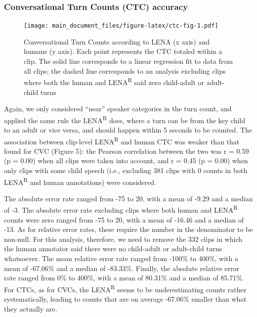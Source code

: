 \documentclass[english,table,man,floatsintext]{apa6}
\begin{document}
\hypertarget{conversational-turn-counts-ctc-accuracy}{%
\subsubsection{Conversational Turn Counts (CTC) accuracy}\label{conversational-turn-counts-ctc-accuracy}}

\begin{figure}
\centering
\texttt{[image: main\_document\_files/figure-latex/ctc-fig-1.pdf]}
\caption{\label{fig:ctc-fig}Conversational Turn Counts according to LENA (x axis) and humans (y axis). Each point represents the CTC totaled within a clip. The solid line corresponds to a linear regression fit to data from all clips; the dashed line corresponds to an analysis excluding clips where both the human and LENA\textsuperscript{R} said zero child-adult or adult-child turns}
\end{figure}

Again, we only considered \enquote{near} speaker categories in the turn count, and applied the same rule the LENA\textsuperscript{R} does, where a turn can be from the key child to an adult or vice versa, and should happen within 5 seconds to be counted. The association between clip-level LENA\textsuperscript{R} and human CTC was weaker than that found for CVC (Figure 5): the Pearson correlation between the two was r = 0.59 (p = 0.00) when all clips were taken into account, and r = 0.45 (p = 0.00) when only clips with some child speech (i.e., excluding 381 clips with 0 counts in both LENA\textsuperscript{R} and human annotations) were considered.

The absolute error rate ranged from -75 to 20, with a mean of -9.29 and a median of -3. The absolute error rate excluding clips where both human and LENA\textsuperscript{R} counts were zero ranged from -75 to 20, with a mean of -16.46 and a median of -13. As for relative error rates, these require the number in the denominator to be non-null. For this analysis, therefore, we need to remove the 332 clips in which the human annotator said there were no child-adult or adult-child turns whatsoever. The mean relative error rate ranged from -100\% to 400\%, with a mean of -67.06\% and a median of -83.33\%. Finally, the absolute relative error rate ranged from 0\% to 400\%, with a mean of 80.31\% and a median of 85.71\%. For CTCs, as for CVCs, the LENA\textsuperscript{R} seems to be underestimating counts rather systematically, leading to counts that are on average -67.06\% smaller than what they actually are.
\end{document}
